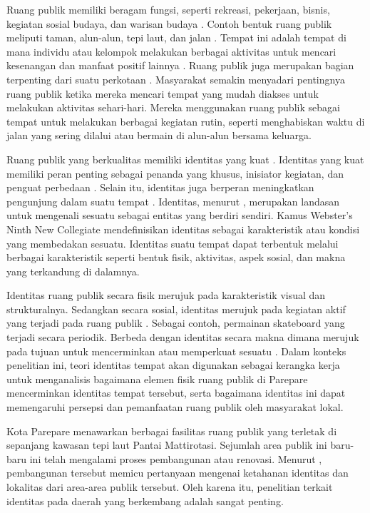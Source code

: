 \documentclass[11pt]{simart} %
\begin{document}
Ruang publik memiliki beragam fungsi, seperti rekreasi, pekerjaan, bisnis, kegiatan sosial budaya, dan warisan budaya \citep{hajmirsadeghi2012}. Contoh bentuk ruang publik meliputi taman, alun-alun, tepi laut, dan jalan \citep{hajmirsadeghi2012}. Tempat ini adalah tempat di mana individu atau kelompok melakukan berbagai aktivitas untuk mencari kesenangan dan manfaat positif lainnya \citep{hajmirsadeghi2012}.
Ruang publik juga merupakan bagian terpenting dari suatu perkotaan \citep{dong2004}. Masyarakat semakin menyadari pentingnya ruang publik ketika mereka mencari tempat yang mudah diakses untuk melakukan aktivitas sehari-hari. Mereka menggunakan ruang publik sebagai tempat untuk melakukan berbagai kegiatan rutin, seperti menghabiskan waktu di jalan yang sering dilalui atau bermain di alun-alun bersama keluarga.

Ruang publik yang berkualitas memiliki identitas yang kuat \citep{hartanti2014}.
Identitas yang kuat memiliki peran penting sebagai penanda yang khusus, inisiator kegiatan, dan penguat perbedaan \citep{hartanti2014}. Selain itu, identitas juga berperan meningkatkan pengunjung dalam suatu tempat \citep{oktay2002}. Identitas, menurut \cite{hartanti2014}, merupakan landasan untuk mengenali sesuatu sebagai entitas yang berdiri sendiri. Kamus Webster’s Ninth New Collegiate mendefinisikan identitas sebagai karakteristik atau kondisi yang membedakan sesuatu. Identitas suatu tempat dapat terbentuk melalui berbagai karakteristik seperti bentuk fisik, aktivitas, aspek sosial, dan makna yang terkandung di dalamnya.

Identitas ruang publik secara fisik merujuk pada karakteristik visual dan strukturalnya.
Sedangkan secara sosial, identitas merujuk pada kegiatan aktif yang terjadi pada ruang publik \citep{al2023}. Sebagai contoh, permainan skateboard yang terjadi secara periodik. Berbeda dengan identitas secara makna dimana merujuk pada tujuan untuk mencerminkan atau memperkuat sesuatu \citep{sari2024}.
Dalam konteks penelitian ini, teori identitas tempat akan digunakan sebagai kerangka kerja untuk menganalisis bagaimana elemen fisik ruang publik di Parepare mencerminkan identitas tempat tersebut, serta bagaimana identitas ini dapat memengaruhi persepsi dan pemanfaatan ruang publik oleh masyarakat lokal.

Kota Parepare menawarkan berbagai fasilitas ruang publik yang terletak di sepanjang kawasan tepi laut Pantai Mattirotasi. Sejumlah area publik ini baru-baru ini telah mengalami proses pembangunan atau renovasi. Menurut \cite{kaymaz2013}, pembangunan tersebut memicu pertanyaan mengenai ketahanan identitas dan lokalitas dari area-area publik tersebut. Oleh karena itu, penelitian terkait identitas pada daerah yang berkembang adalah sangat penting.
\end{document}
